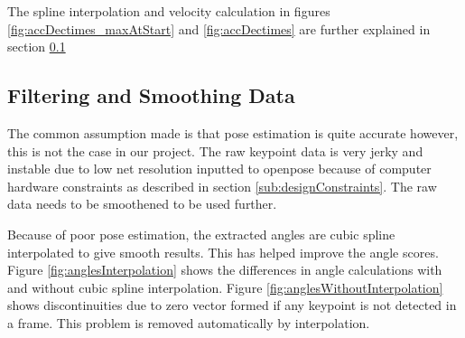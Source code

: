 The spline interpolation and velocity calculation in figures \ref{fig:accDectimes_maxAtStart} and \ref{fig:accDectimes} are further explained in section \ref{section:filteringSmoothing}

\subsection{Filtering and Smoothing Data}
\label{section:filteringSmoothing}
The common assumption made is that pose estimation is quite accurate however, this is not the case in our project. The raw keypoint data is very jerky and instable due to low net resolution inputted to openpose because of computer hardware constraints as described in section \ref{sub:designConstraints}. The raw data needs to be smoothened to be used further. 


Because of poor pose estimation, the extracted angles are cubic spline interpolated to give smooth results. This has helped improve the angle scores. Figure \ref{fig:anglesInterpolation} shows the differences in angle calculations with and without cubic spline interpolation. Figure \ref{fig:anglesWithoutInterpolation} shows discontinuities due to zero vector formed if any keypoint is not detected in a frame. This problem is removed automatically by interpolation. 

